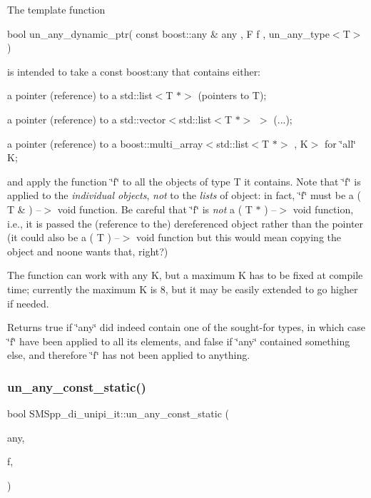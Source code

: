 The template function

bool un\+\_\+any\+\_\+dynamic\+\_\+ptr( const boost\+::any \& any , F f , un\+\_\+any\+\_\+type$<$\+T$>$ )

is intended to take a const boost\+:any that contains either\+:


\begin{DoxyItemize}
\item a pointer (reference) to a std\+::list$<$\+T $\ast$$>$ (pointers to T);
\item a pointer (reference) to a std\+::vector$<$std\+::list$<$\+T $\ast$$>$ $>$ (...);
\item a pointer (reference) to a boost\+::multi\+\_\+array$<$std\+::list$<$\+T $\ast$$>$ , K$>$ for \char`\"{}all\char`\"{} K;
\end{DoxyItemize}

and apply the function \char`\"{}f\char`\"{} to all the objects of type T it contains. Note that \char`\"{}f\char`\"{} is applied to the {\itshape individual objects}, {\itshape not} to the {\itshape lists} of object\+: in fact, \char`\"{}f\char`\"{} must be a ( T \& ) --$>$ void function. Be careful that \char`\"{}f\char`\"{} is {\itshape not} a ( T $\ast$ ) --$>$ void function, i.\+e., it is passed the (reference to the) dereferenced object rather than the pointer (it could also be a ( T ) --$>$ void function but this would mean copying the object and noone wants that, right?)

The function can work with any K, but a maximum K has to be fixed at compile time; currently the maximum K is 8, but it may be easily extended to go higher if needed.

Returns true if \char`\"{}any\char`\"{} did indeed contain one of the sought-\/for types, in which case \char`\"{}f\char`\"{} have been applied to all its elements, and false if \char`\"{}any\char`\"{} contained something else, and therefore \char`\"{}f\char`\"{} has not been applied to anything. \mbox{\label{group__boost__any__stuff_ga4d88b50d748bc8cbf4647b5db0ea44f0}} 
\subsubsection{\texorpdfstring{un\+\_\+any\+\_\+const\+\_\+static()}{un\_any\_const\_static()}}
{\footnotesize\ttfamily bool S\+M\+Spp\+\_\+di\+\_\+unipi\+\_\+it\+::un\+\_\+any\+\_\+const\+\_\+static (\begin{DoxyParamCaption}\item[{const boost\+::any \&}]{any,  }\item[{F}]{f,  }\item[{\mbox{\hyperlink{struct_s_m_spp__di__unipi__it_1_1un__any__type}{un\+\_\+any\+\_\+type}}$<$ T $>$}]{ }\end{DoxyParamCaption})}

